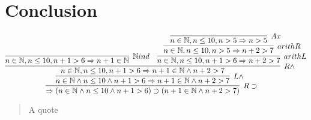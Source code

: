 \documentclass{llncs}
\newcommand{\hook}{\supset}
\begin{document}
\section{Conclusion}

\[
\infer[R\hook]{\Rightarrow (n \in \mathbb{N} \wedge n \leq 10 \wedge n+1 > 6)\hook(n+1 \in \mathbb{N} \wedge n+2 > 7)}
	{\infer[L\wedge]{n \in \mathbb{N} \wedge n \leq 10 \wedge n+1 > 6 \Rightarrow n+1 \in \mathbb{N} \wedge n+2 > 7}
		{\infer[R\wedge]{n \in \mathbb{N}, n \leq 10, n+1 > 6 \Rightarrow n+1 \in \mathbb{N} \wedge n+2 > 7}
			{\infer[\mathbb{N}ind]{n \in \mathbb{N}, n \leq 10, n+1 > 6 \Rightarrow n+1 \in \mathbb{N}}{} & \infer[arithL]{n \in \mathbb{N},n\leq 10, n+1 > 6 \Rightarrow n+2 >7}{\infer[arithR]{n \in \mathbb{N}, n \leq 10, n>5 \Rightarrow n+2 >7}{\infer[Ax]{n \in \mathbb{N},n\leq 10, n >5 \Rightarrow n>5}{}}}}}}
\]

\begin{quote} A quote
\end{quote}
\end{document}
